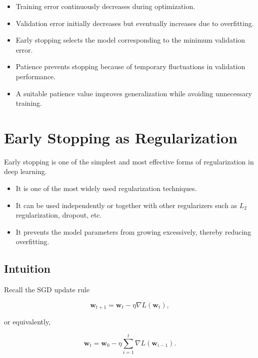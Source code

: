 \documentclass[11pt]{article}
\begin{document}
\begin{itemize}
	
	\item Training error continuously decreases during optimization.
	
	\item Validation error initially decreases but eventually increases due to overfitting.
	
	\item Early stopping selects the model corresponding to the minimum validation error.
	
	\item Patience prevents stopping because of temporary fluctuations in validation performance.
	
	\item A suitable patience value improves generalization while avoiding unnecessary training.
	
\end{itemize}

\section{Early Stopping as Regularization}

Early stopping is one of the simplest and most effective forms of
regularization in deep learning.

\begin{itemize}
	\item It is one of the most widely used regularization techniques.
	\item It can be used independently or together with other regularizers
	such as $L_2$ regularization, dropout, etc.
	\item It prevents the model parameters from growing excessively,
	thereby reducing overfitting.
\end{itemize}


\subsection{Intuition}

Recall the SGD update rule

\[
\mathbf{w}_{t+1}
=
\mathbf{w}_{t}
-\eta \nabla L(\mathbf{w}_{t}),
\]

or equivalently,

\[
\mathbf{w}_{t}
=
\mathbf{w}_{0}
-
\eta
\sum_{i=1}^{t}
\nabla L(\mathbf{w}_{i-1}).
\]
\end{document}
